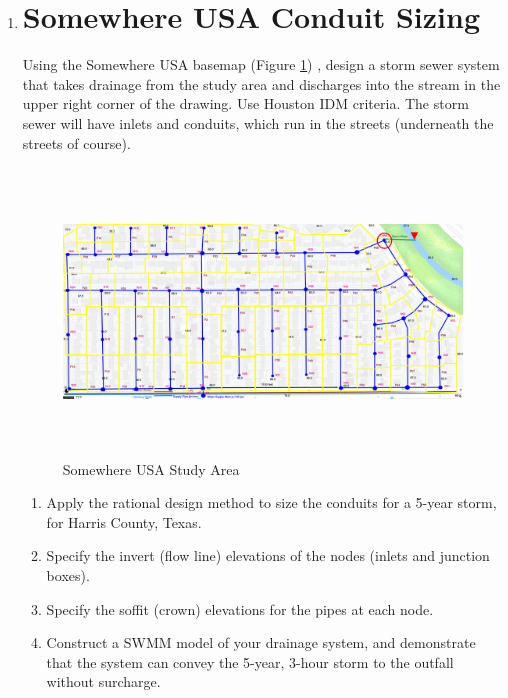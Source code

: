 \documentclass[12pt]{article}
\begin{document}
\begin{enumerate}
\item \section*{\small{Somewhere USA Conduit Sizing}}

Using the Somewhere USA basemap (Figure \ref{fig:swusa})
, design a storm sewer system that takes drainage from the study area and discharges into the stream in the upper right corner of the drawing.  Use Houston IDM criteria.  The storm sewer will have inlets and conduits, which run in the streets (underneath the streets of course).

\begin{figure}[h!] %
   \centering
   \includegraphics[height=3in]{SomewhereClipNodes.jpg} 
   \caption{Somewhere USA Study Area}
   \label{fig:swusa}
\end{figure}
\clearpage

\begin{enumerate}
\item Apply the rational design method to size the conduits for a 5-year storm, for Harris County, Texas.
\item Specify the invert (flow line) elevations of the nodes (inlets and junction boxes).
\item Specify the soffit (crown) elevations for the pipes at each node.
\item Construct a SWMM model of your drainage system, and demonstrate that the system can convey the 5-year, 3-hour storm to the outfall without surcharge.
\end{enumerate}


\end{enumerate}










 
\end{document}

